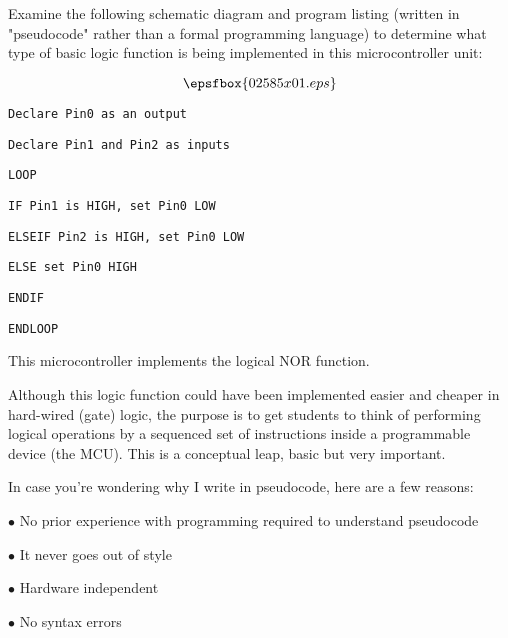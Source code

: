 

Examine the following schematic diagram and program listing (written in "pseudocode" rather than a formal programming language) to determine what type of basic logic function is being implemented in this microcontroller unit:

$$\epsfbox{02585x01.eps}$$

\noindent
{}

{\tt Declare Pin0 as an output}

{\tt Declare Pin1 and Pin2 as inputs}

{\tt LOOP}

\hskip 10pt {\tt IF Pin1 is HIGH, set Pin0 LOW}

\hskip 10pt {\tt ELSEIF Pin2 is HIGH, set Pin0 LOW}

\hskip 10pt {\tt ELSE set Pin0 HIGH}

\hskip 10pt {\tt ENDIF}

{\tt ENDLOOP}

\vskip 10pt







This microcontroller implements the logical NOR function.







Although this logic function could have been implemented easier and cheaper in hard-wired (gate) logic, the purpose is to get students to think of performing logical operations by a sequenced set of instructions inside a programmable device (the MCU).  This is a conceptual leap, basic but very important.

\vskip 10pt

In case you're wondering why I write in pseudocode, here are a few reasons:

\medskip
\goodbreak
\item{$\bullet$} No prior experience with programming required to understand pseudocode
\item{$\bullet$} It never goes out of style
\item{$\bullet$} Hardware independent
\item{$\bullet$} No syntax errors
\medskip

